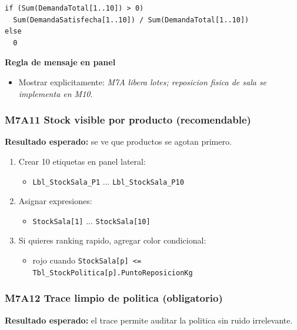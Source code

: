 \documentclass[11pt]{article}
\newcommand{\simio}[1]{\texttt{#1}}
\newcommand{\state}[1]{\texttt{#1}}
\begin{document}
\begin{lstlisting}[caption={Expresion recomendada de fill rate para panel M7A}]
if (Sum(DemandaTotal[1..10]) > 0)
  Sum(DemandaSatisfecha[1..10]) / Sum(DemandaTotal[1..10])
else
  0
\end{lstlisting}

\textbf{Regla de mensaje en panel}
\begin{itemize}
  \item Mostrar explicitamente: \textit{M7A libera lotes; reposicion fisica de sala se implementa en M10}.
\end{itemize}

\subsubsection{M7A11 Stock visible por producto (recomendable)}
\textbf{Resultado esperado:} se ve que productos se agotan primero.

\begin{enumerate}
  \item Crear 10 etiquetas en panel lateral:
  \begin{itemize}
    \item \simio{Lbl\_StockSala\_P1} ... \simio{Lbl\_StockSala\_P10}
  \end{itemize}
  \item Asignar expresiones:
  \begin{itemize}
    \item \state{StockSala[1]} ... \state{StockSala[10]}
  \end{itemize}
  \item Si quieres ranking rapido, agregar color condicional:
  \begin{itemize}
    \item rojo cuando \state{StockSala[p] <= Tbl\_StockPolitica[p].PuntoReposicionKg}
  \end{itemize}
\end{enumerate}

\subsubsection{M7A12 Trace limpio de politica (obligatorio)}
\textbf{Resultado esperado:} el trace permite auditar la politica sin ruido irrelevante.
\end{document}
